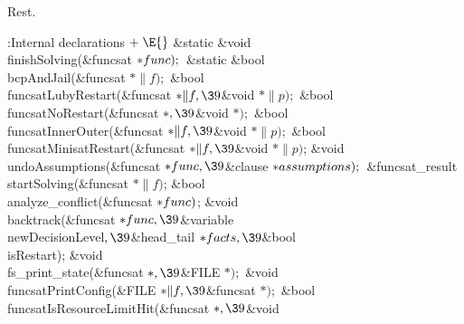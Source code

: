 {{{{{Rest.

\Y\B\4:Internal declarations\X${}\mathrel+\E{}$\6
\&{static} \&{void} \\{finishSolving}(\&{funcsat} ${}{*}\\{func});{}$\6
\&{static} \&{bool} \\{bcpAndJail}(\&{funcsat} ${}{*}\|f);{}$\6
\&{bool} \\{funcsatLubyRestart}(\&{funcsat} ${}{*}\|f,\39{}$\&{void} ${}{*}%
\|p);{}$\6
\&{bool} \\{funcsatNoRestart}(\&{funcsat} ${}{*},\39{}$\&{void} ${}{*});{}$\6
\&{bool} \\{funcsatInnerOuter}(\&{funcsat} ${}{*}\|f,\39{}$\&{void} ${}{*}%
\|p);{}$\6
\&{bool} \\{funcsatMinisatRestart}(\&{funcsat} ${}{*}\|f,\39{}$\&{void} ${}{*}%
\|p){}$;\6
\&{void} \\{undoAssumptions}(\&{funcsat} ${}{*}\\{func},\39{}$\&{clause} ${}{*}%
\\{assumptions});{}$\6
\&{funcsat\_result} \\{startSolving}(\&{funcsat} ${}{*}\|f){}$;\6
\&{bool} \\{analyze\_conflict}(\&{funcsat} ${}{*}\\{func}){}$;\6
\&{void} \\{backtrack}(\&{funcsat} ${}{*}\\{func},\39{}$\&{variable} %
\\{newDecisionLevel}${},\39{}$\&{head\_tail} ${}{*}\\{facts},\39{}$\&{bool} %
\\{isRestart});\6
\&{void} \\{fs\_print\_state}(\&{funcsat} ${}{*},\39{}$\&{FILE} ${}{*});{}$\6
\&{void} \\{funcsatPrintConfig}(\&{FILE} ${}{*}\|f,\39{}$\&{funcsat}
${}{*});{}$\6
\&{bool} \\{funcsatIsResourceLimitHit}(\&{funcsat} ${}{*},\39{}$\&{void}
}}}}}
